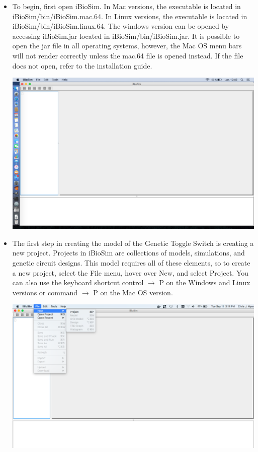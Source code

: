 \documentclass[titlepage,11pt]{article}
\begin{document}
\noindent
\begin{itemize}
\item To begin, first open iBioSim. In Mac versions, the executable is located in iBioSim/bin/iBioSim.mac.64. In Linux versions, the executable is located in iBioSim/bin/iBioSim.linux.64. The windows version can be opened by accessing iBioSim.jar located in iBioSim/bin/iBioSim.jar. It is possible to open the jar file in all operating systems, however, the Mac OS menu bars will not render correctly unless the mac.64 file is opened instead. If the file does not open, refer to the installation guide.

\begin{center}
\includegraphics[width=160mm]{screenshots/iBioSim}
\end{center}

\item The first step in creating the model of the Genetic Toggle Switch is creating a new project. Projects in iBioSim are collections of models, simulations, and genetic circuit designs. This model requires all of these elements, so to create a new project, select the File menu, hover over New, and select Project. You can also use the keyboard shortcut control $\rightarrow$ P on the Windows and Linux versions or command $\rightarrow$ P on the Mac OS version.  

\begin{center}
\includegraphics[width=160mm]{screenshots/project}
\end{center}


\end{itemize}
\end{document}

